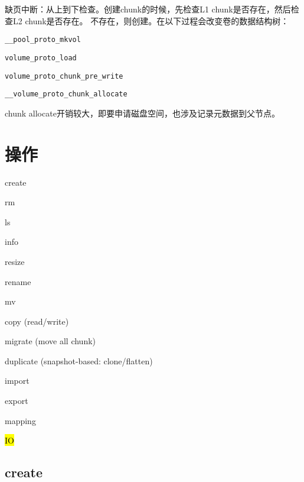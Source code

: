 缺页中断：从上到下检查。创建chunk的时候，先检查L1 chunk是否存在，然后检查L2 chunk是否存在。
不存在，则创建。在以下过程会改变卷的数据结构树：
\begin{compactitem}
\item \verb|__pool_proto_mkvol|
\item \verb|volume_proto_load|
\item \verb|volume_proto_chunk_pre_write|
\item \verb|__volume_proto_chunk_allocate|
\end{compactitem}

chunk allocate开销较大，即要申请磁盘空间，也涉及记录元数据到父节点。

\section{操作}

\begin{enumbox}
\item create
\item rm
\item ls
\item info
\item resize
\item rename
\item mv
\item copy (read/write)
\item migrate (move all chunk)
\item duplicate (snapshot-based: clone/flatten)
\item import
\item export
\item mapping
\item \hl{IO}
\end{enumbox}

\subsection{create}
